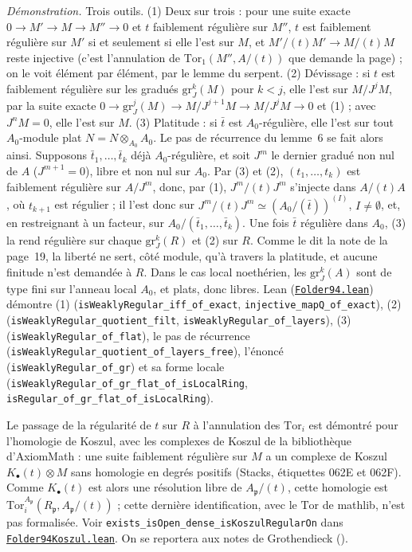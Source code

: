 {\small \emph{Démonstration.} Trois outils. (1) Deux sur trois : pour une suite exacte $0 \to M' \to M \to M'' \to 0$ et $t$ faiblement régulière sur $M''$, $t$ est faiblement régulière sur $M'$ si et seulement si elle l'est sur $M$, et $M'/(t)M' \to M/(t)M$ reste injective (c'est l'annulation de $\mathrm{Tor}_1(M'', A/(t))$ que demande la page) ; on le voit élément par élément, par le lemme du serpent. (2) Dévissage : si $t$ est faiblement régulière sur les gradués $\mathrm{gr}^k_J(M)$ pour $k < j$, elle l'est sur $M/J^jM$, par la suite exacte $0 \to \mathrm{gr}^j_J(M) \to M/J^{j+1}M \to M/J^jM \to 0$ et (1) ; avec $J^nM = 0$, elle l'est sur $M$. (3) Platitude : si $\bar t$ est $A_0$-régulière, elle l'est sur tout $A_0$-module plat $N = N \otimes_{A_0} A_0$. Le pas de récurrence du lemme~6 se fait alors ainsi. Supposons $\bar t_1, \ldots, \bar t_k$ déjà $A_0$-régulière, et soit $J^m$ le dernier gradué non nul de $A$ ($J^{m+1} = 0$), libre et non nul sur $A_0$. Par (3) et (2), $(t_1, \ldots, t_k)$ est faiblement régulière sur $A/J^m$, donc, par (1), $J^m/(t)J^m$ s'injecte dans $A/(t)A$, où $t_{k+1}$ est régulier ; il l'est donc sur $J^m/(t)J^m \simeq (A_0/(\bar t))^{(I)}$, $I \neq \emptyset$, et, en restreignant à un facteur, sur $A_0/(\bar t_1, \ldots, \bar t_k)$. Une fois $\bar t$ régulière dans $A_0$, (3) la rend régulière sur chaque $\mathrm{gr}^k_J(R)$ et (2) sur $R$. Comme le dit la note de la page~19, la liberté ne sert, côté module, qu'à travers la platitude, et aucune finitude n'est demandée à $R$. Dans le cas local noethérien, les $\mathrm{gr}^k_J(A)$ sont de type fini sur l'anneau local $A_0$, et plats, donc libres. Lean (\href{\leanblob/RingTheory/Folder94.lean}{\texttt{Folder94.\allowbreak{}lean}}) démontre (1) (\texttt{isWeaklyRegular\_iff\_of\_exact}, \texttt{injective\_mapQ\_of\_exact}), (2) (\texttt{isWeaklyRegular\_quotient\_filt}, \texttt{isWeaklyRegular\_of\_layers}), (3) (\texttt{isWeaklyRegular\_of\_flat}), le pas de récurrence (\texttt{isWeaklyRegular\_quotient\_of\_layers\_free}), l'énoncé (\texttt{isWeaklyRegular\_of\_gr}) et sa forme locale (\texttt{isWeaklyRegular\_of\_gr\_flat\_of\_isLocalRing}, \texttt{isRegular\_of\_gr\_flat\_of\_isLocalRing}).\par}
{\small Le passage de la régularité de $t$ sur $R$ à l'annulation des $\mathrm{Tor}_i$ est démontré pour l'homologie de Koszul, avec les complexes de Koszul de la bibliothèque d'AxiomMath \cite{axiomstacks} : une suite faiblement régulière sur $M$ a un complexe de Koszul $K_\bullet(t) \otimes M$ sans homologie en degrés positifs (Stacks, étiquettes 062E et 062F). Comme $K_\bullet(t)$ est alors une résolution libre de $A_{\mathfrak p}/(t)$, cette homologie est $\mathrm{Tor}_i^{A_{\mathfrak p}}(R_{\mathfrak p}, A_{\mathfrak p}/(t))$ ; cette dernière identification, avec le $\mathrm{Tor}$ de mathlib, n'est pas formalisée. Voir \texttt{exists\_isOpen\_dense\_isKoszulRegularOn} dans \href{\leanblobmain/RingTheory/Folder94Koszul.lean}{\texttt{Folder94Koszul.\allowbreak{}lean}}. On se reportera aux notes de Grothendieck ().\par}

